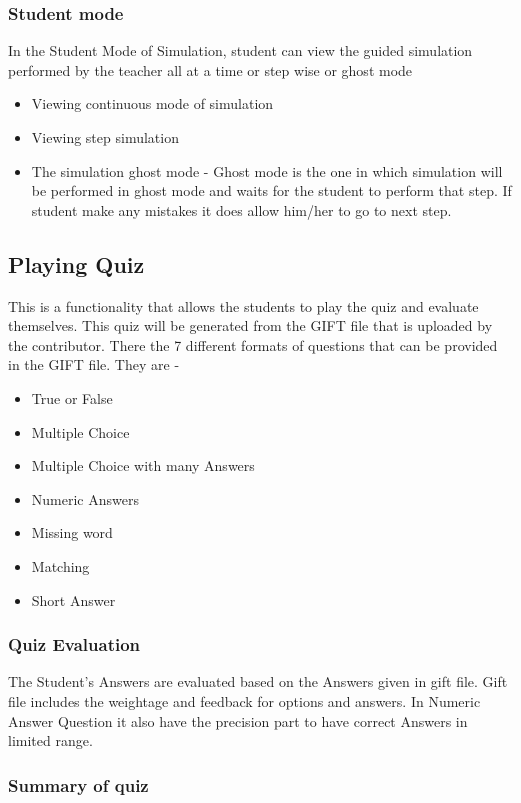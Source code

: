 \documentclass[12pt]{report}
\begin{document}
\subsubsection{Student mode}
	In the Student Mode of Simulation, student can view the guided simulation performed by the teacher all at a time or step wise or ghost mode

\begin{itemize}
\item Viewing continuous mode of simulation
\item Viewing step simulation
\item The simulation ghost mode - Ghost mode is the one in which simulation will be performed in ghost mode and waits for the student to perform that step. If student make any mistakes it does allow him/her to go to next step.

\end{itemize}

\subsection{Playing Quiz}

This is a functionality that allows the students to play the quiz and evaluate themselves. This quiz will be generated from the GIFT file that is uploaded by the contributor.
There the 7 different formats of questions that can be provided in the GIFT file. They are -
\begin{itemize}
\item True or False
\item Multiple Choice
\item Multiple Choice with many Answers 
\item Numeric Answers
\item Missing word 
\item Matching
\item Short Answer
\end{itemize}

\subsubsection{Quiz Evaluation}
	The Student's Answers are evaluated based on the Answers given in gift file. Gift file includes the weightage and feedback for options and answers. In Numeric Answer Question it also have the precision part to have correct Answers in limited range.
	
\subsubsection{Summary of quiz}
\end{document}
